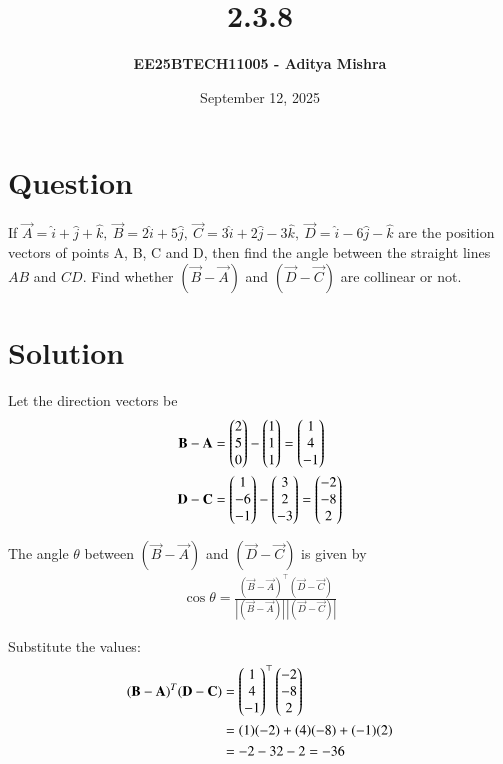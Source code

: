 \documentclass[12pt]{article}
\title{\textbf{2.3.8}}
\author{\textbf{EE25BTECH11005 - Aditya Mishra}}
\date{September 12, 2025}
\begin{document}
\maketitle
\section*{Question}
If $ \vec{A} = \hat{i} + \hat{j} + \hat{k},\ \vec{B} = 2\hat{i} + 5\hat{j},\ \vec{C} = 3\hat{i} + 2\hat{j} - 3\hat{k},\ \vec{D} = \hat{i} - 6\hat{j} - \hat{k}$ are the position vectors of points A, B, C and D, then find the angle between the straight lines $AB$ and $CD$. Find whether $(\vec{B}-\vec{A})$ and $(\vec{D}-\vec{C})$ are collinear or not.

\section*{Solution}
Let the direction vectors be
\begin{align}
\mathbf{B} - \mathbf{A} &= \begin{pmatrix}2\\5\\0\end{pmatrix} - \begin{pmatrix}1\\1\\1\end{pmatrix} = \begin{pmatrix}1\\4\\-1\end{pmatrix} \\
\mathbf{D} - \mathbf{C} &= \begin{pmatrix}1\\-6\\-1\end{pmatrix} - \begin{pmatrix}3\\2\\-3\end{pmatrix} = \begin{pmatrix}-2\\-8\\2\end{pmatrix}
\end{align}

The angle $\theta$ between $(\vec{B}-\vec{A})$ and $(\vec{D}-\vec{C})$ is given by
\begin{align}
\cos\theta = \frac{(\vec{B}-\vec{A})^\top (\vec{D}-\vec{C})}{|(\vec{B}-\vec{A})|\,|(\vec{D}-\vec{C})|}
\end{align}

Substitute the values:
\begin{align}
(\mathbf{B}-\mathbf{A})^T (\mathbf{D}-\mathbf{C}) &= \begin{pmatrix}1\\4\\-1\end{pmatrix}^\top \begin{pmatrix}-2\\-8\\2\end{pmatrix} \\
&= (1)(-2) + (4)(-8) + (-1)(2) \\
&= -2 - 32 - 2 = -36 
\end{align}
\end{document}
